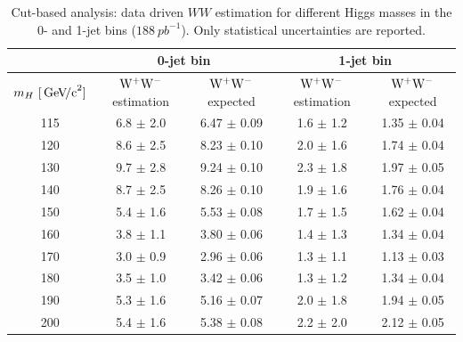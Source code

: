 \begin{table}[!htbp]
\begin{center}
\begin{tabular}{|c|c|c|c|c|} \hline
 & \multicolumn{2}{|c|}{0-jet bin} & \multicolumn{2}{|c|}{1-jet bin} \\ \hline
$m_H~[\,\mathrm{Ge\kern -0.1em V\!/c}^2]$ & $\mathrm{W}^+\mathrm{W}^-$ estimation & $\mathrm{W}^+\mathrm{W}^-$ expected & $\mathrm{W}^+\mathrm{W}^-$ estimation & $\mathrm{W}^+\mathrm{W}^-$ expected \\ \hline
115 & 6.8 $\pm$ 2.0 & 6.47 $\pm$ 0.09 & 1.6 $\pm$ 1.2 & 1.35 $\pm$ 0.04 \\
120 & 8.6 $\pm$ 2.5 & 8.23 $\pm$ 0.10 & 2.0 $\pm$ 1.6 & 1.74 $\pm$ 0.04 \\
130 & 9.7 $\pm$ 2.8 & 9.24 $\pm$ 0.10 & 2.3 $\pm$ 1.8 & 1.97 $\pm$ 0.05 \\
140 & 8.7 $\pm$ 2.5 & 8.26 $\pm$ 0.10 & 1.9 $\pm$ 1.6 & 1.76 $\pm$ 0.04 \\
150 & 5.4 $\pm$ 1.6 & 5.53 $\pm$ 0.08 & 1.7 $\pm$ 1.5 & 1.62 $\pm$ 0.04 \\
160 & 3.8 $\pm$ 1.1 & 3.80 $\pm$ 0.06 & 1.4 $\pm$ 1.3 & 1.34 $\pm$ 0.04 \\
170 & 3.0 $\pm$ 0.9 & 2.96 $\pm$ 0.06 & 1.3 $\pm$ 1.1 & 1.13 $\pm$ 0.03 \\
180 & 3.5 $\pm$ 1.0 & 3.42 $\pm$ 0.06 & 1.3 $\pm$ 1.2 & 1.34 $\pm$ 0.04 \\
190 & 5.3 $\pm$ 1.6 & 5.16 $\pm$ 0.07 & 2.0 $\pm$ 1.8 & 1.94 $\pm$ 0.05 \\
200 & 5.4 $\pm$ 1.6 & 5.38 $\pm$ 0.08 & 2.2 $\pm$ 2.0 & 2.12 $\pm$ 0.05 \\  \hline
\end{tabular}
\caption{Cut-based analysis: data driven $WW$ estimation for different Higgs masses in the 0- and 1-jet bins ($188~pb^{-1}$). 
Only statistical uncertainties are reported.}
\label{tab:wwEstimResData}
\end{center}
\end{table}

